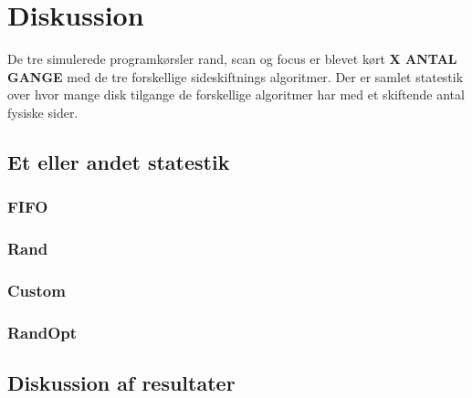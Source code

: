 \section{Diskussion}
De tre simulerede programkørsler rand, scan og focus er blevet kørt \textbf{X ANTAL GANGE} med de tre forskellige sideskiftnings algoritmer. Der er samlet statestik over hvor mange disk tilgange de forskellige algoritmer har med et skiftende antal fysiske sider.

\subsection{Et eller andet statestik}

\subsubsection{FIFO}

\subsubsection{Rand}

\subsubsection{Custom}

\subsubsection{RandOpt}

\subsection{Diskussion af resultater}